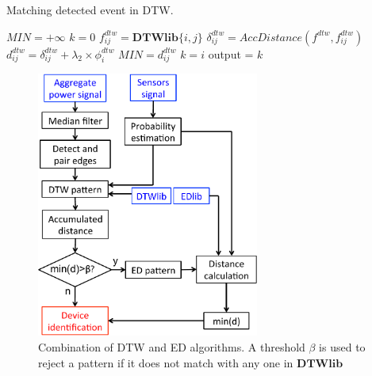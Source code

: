 \begin{algorithm}
\caption{Matching detected event in DTW.}\label{algo:DTW2}
\begin{algorithmic}[1]
\State $MIN = +\infty$
\State $k = 0$
		    \State $f_{ij}^{dtw} = \mathbf{DTWlib}\{i,j\}$
		    \State $\delta_{ij}^{dtw} = AccDistance(f^{dtw},f_{ij}^{dtw})$
		    \State $d_{ij}^{dtw} = \delta_{ij}^{dtw} + \lambda_2\times \phi_i^{dtw}$
		        \State $MIN = d_{ij}^{dtw}$
		        \State $k = i$
		    \EndIf
		 \EndFor
	\EndFor
\State output = $k$
\EndFunction
\end{algorithmic}
\end{algorithm}

\begin{figure}[!ht]
\centering
\includegraphics[width=0.65\textwidth]{./chapters/chapter4/images/DTWschema.pdf} 
\caption{Combination of DTW and ED algorithms. A threshold $\beta$ is used to reject a pattern if it does not match with any one in $\mathbf{DTWlib}$} 
\label{fig:dtw1} 
\end{figure}
